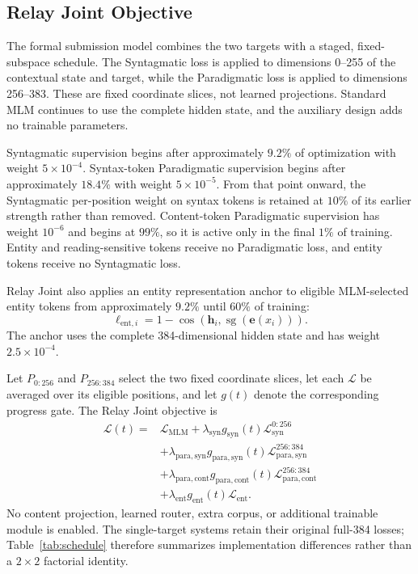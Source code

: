 \documentclass[11pt,a4paper]{article}
\begin{document}
\subsection{Relay Joint Objective}
\label{sec:relay-joint}

The formal submission model combines the two targets with a staged,
fixed-subspace schedule. The Syntagmatic loss is applied to dimensions
0--255 of the contextual state and target, while the Paradigmatic loss
is applied to dimensions 256--383. These are fixed coordinate slices,
not learned projections. Standard MLM continues to use the complete
hidden state, and the auxiliary design adds no trainable parameters.

Syntagmatic supervision begins after approximately $9.2\%$ of
optimization with weight $5\times10^{-4}$. Syntax-token Paradigmatic
supervision begins after approximately $18.4\%$ with weight
$5\times10^{-5}$. From that point onward, the Syntagmatic
per-position weight on syntax tokens is retained at $10\%$ of its
earlier strength rather than removed. Content-token Paradigmatic
supervision has weight $10^{-6}$ and begins at $99\%$, so it is
active only in the final $1\%$ of training. Entity and
reading-sensitive tokens receive no Paradigmatic loss, and entity
tokens receive no Syntagmatic loss.

Relay Joint also applies an entity representation anchor to eligible
MLM-selected entity tokens from approximately $9.2\%$ until
$60\%$ of training:
\begin{equation}
\ell_{\mathrm{ent},i}
=1-\cos\left(
\mathbf{h}_i,
\operatorname{sg}(\mathbf{e}(x_i))
\right).
\label{eq:entity-anchor}
\end{equation}
The anchor uses the complete 384-dimensional hidden state and has
weight $2.5\times10^{-4}$.

Let $P_{0:256}$ and $P_{256:384}$ select the two fixed coordinate
slices, let each $\mathcal{L}$ be averaged over its eligible
positions, and let $g(t)$ denote the corresponding progress gate.
The Relay Joint objective is
\begin{align}
\mathcal{L}(t)={}&\mathcal{L}_{\mathrm{MLM}}
+\lambda_{\mathrm{syn}}g_{\mathrm{syn}}(t)
\mathcal{L}_{\mathrm{syn}}^{0:256}
\nonumber\\
&+\lambda_{\mathrm{para,syn}}g_{\mathrm{para,syn}}(t)
\mathcal{L}_{\mathrm{para,syn}}^{256:384}
\nonumber\\
&+\lambda_{\mathrm{para,cont}}g_{\mathrm{para,cont}}(t)
\mathcal{L}_{\mathrm{para,cont}}^{256:384}
\nonumber\\
&+\lambda_{\mathrm{ent}}g_{\mathrm{ent}}(t)
\mathcal{L}_{\mathrm{ent}} .
\label{eq:relay-loss}
\end{align}
No content projection, learned router, extra corpus, or additional
trainable module is enabled. The single-target systems retain their
original full-384 losses; Table~\ref{tab:schedule} therefore
summarizes implementation differences rather than a $2\times2$
factorial identity.
\end{document}
